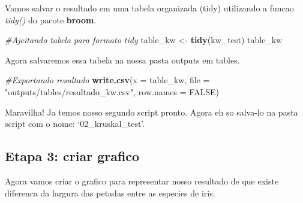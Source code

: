 \documentclass[
]{book}
\newenvironment{Shaded}{\begin{snugshade}}{\end{snugshade}}
\newcommand{\AttributeTok}[1]{\textcolor[rgb]{0.13,0.29,0.53}{#1}}
\newcommand{\CommentTok}[1]{\textcolor[rgb]{0.56,0.35,0.01}{\textit{#1}}}
\newcommand{\ConstantTok}[1]{\textcolor[rgb]{0.56,0.35,0.01}{#1}}
\newcommand{\FunctionTok}[1]{\textcolor[rgb]{0.13,0.29,0.53}{\textbf{#1}}}
\newcommand{\NormalTok}[1]{#1}
\newcommand{\OtherTok}[1]{\textcolor[rgb]{0.56,0.35,0.01}{#1}}
\newcommand{\StringTok}[1]{\textcolor[rgb]{0.31,0.60,0.02}{#1}}
\begin{document}
Vamos salvar o resultado em uma tabela organizada (tidy) utilizando a funcao \emph{tidy()} do pacote \textbf{broom}.

\begin{Shaded}
\begin{Highlighting}[]

\CommentTok{\#Ajeitando tabela para formato tidy}
\NormalTok{table\_kw }\OtherTok{\textless{}{-}} \FunctionTok{tidy}\NormalTok{(kw\_test)}
\NormalTok{table\_kw}
\end{Highlighting}
\end{Shaded}

Agora salvaremos essa tabela na nossa pasta outputs em tables.

\begin{Shaded}
\begin{Highlighting}[]

\CommentTok{\#Exportando resultado}
\FunctionTok{write.csv}\NormalTok{(}\AttributeTok{x =}\NormalTok{ table\_kw,                                 }
          \AttributeTok{file =} \StringTok{"outputs/tables/resultado\_kw.csv"}\NormalTok{,}
          \AttributeTok{row.names =} \ConstantTok{FALSE}\NormalTok{)}
\end{Highlighting}
\end{Shaded}

Maravilha! Ja temos nosso segundo script pronto. Agora eh so salva-lo na pasta script com o nome: `02\_kruskal\_test'.

\hypertarget{etapa-3-criar-grafico}{%
\subsection{Etapa 3: criar grafico}\label{etapa-3-criar-grafico}}

Agora vamos criar o grafico para representar nosso resultado de que existe diferenca da largura das petadas entre as especies de iris.
\end{document}

